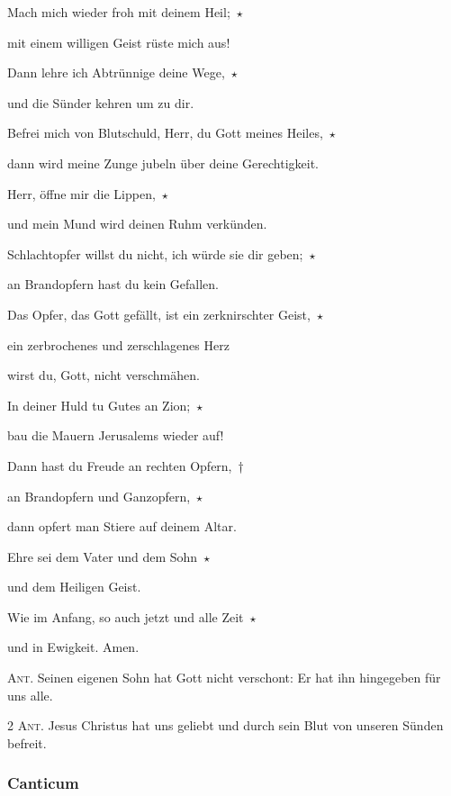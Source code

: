 \noindent Mach mich wieder froh mit deinem Heil;~$\star$~\nopagebreak

mit einem willigen Geist rüste mich aus!

\noindent Dann lehre ich Abtrünnige deine Wege,~$\star$~\nopagebreak

und die Sünder kehren um zu dir.

\noindent Befrei mich von Blutschuld, Herr, du Gott meines Heiles,~$\star$~\nopagebreak

dann wird meine Zunge jubeln über deine Gerechtigkeit.

\noindent Herr, öffne mir die Lippen,~$\star$~\nopagebreak

und mein Mund wird deinen Ruhm verkünden.

\noindent Schlachtopfer willst du nicht, ich würde sie dir geben;~$\star$~\nopagebreak

an Brandopfern hast du kein Gefallen.

\noindent Das Opfer, das Gott gefällt, ist ein zerknirschter Geist,~$\star$~\nopagebreak

ein zerbrochenes und zerschlagenes Herz 

wirst du, Gott, nicht verschmähen.

\noindent In deiner Huld tu Gutes an Zion;~$\star$~\nopagebreak

bau die Mauern Jerusalems wieder auf!

\noindent Dann hast du Freude an rechten Opfern,~†~\nopagebreak

an Brandopfern und Ganzopfern,~$\star$~\nopagebreak

dann opfert man Stiere auf deinem Altar.

\noindent Ehre sei dem Vater und dem Sohn~$\star$~\nopagebreak

und dem Heiligen Geist.

\noindent Wie im Anfang, so auch jetzt und alle Zeit~$\star$~\nopagebreak

und in Ewigkeit. Amen.

\vspace{10pt}

\noindent \textsc{Ant.} Seinen eigenen Sohn hat Gott nicht verschont: Er hat ihn hingegeben für uns alle.

\vspace{10pt}

\noindent \textsc{2 Ant.} Jesus Christus hat uns geliebt und durch sein Blut von unseren Sünden befreit. \nopagebreak

\subsubsection{Canticum}

